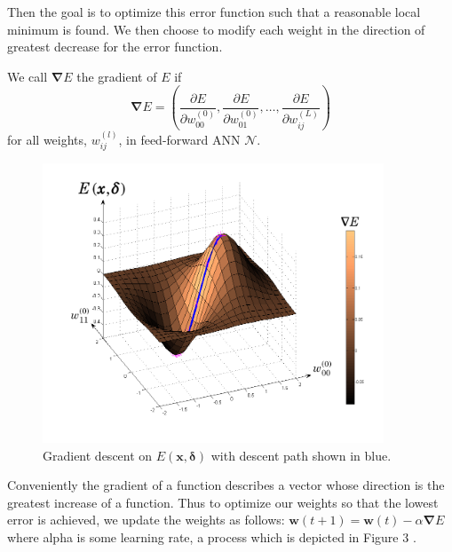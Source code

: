 Then the goal is to optimize this error function such that a reasonable local minimum is found. We then choose to modify each weight in the direction of greatest decrease for the error function. 
\begin{definition}
We call \(\pmb{\nabla}E\) the gradient of \(E\) if 
\[\pmb{\nabla}E = \left(\frac{\partial E}{\partial w_{00}^{(0)}}, 
\frac{\partial E}{\partial w_{01}^{(0)}},\dots,
\frac{\partial E}{\partial w_{ij}^{(L)}}\right)\]
for all weights, \(w_{ij}^{(l)}\), in feed-forward ANN \(\mathcal{N}\).
\end{definition}
\begin{figure}
\centering
 \includegraphics[width=4in]{gradient_descent}
 \caption{Gradient descent on \(E\left(\pmb{x}, \pmb{\delta}\right)\) with descent path shown in blue.}
\end{figure}
Conveniently the gradient of a function describes a vector whose direction is the greatest increase of a function. Thus to optimize our weights so that the lowest error is achieved, we update the weights as follows: \(\pmb{w}(t+1) = \pmb{w}(t)-\alpha \pmb{\nabla}E\) where alpha is some learning rate, a process which is depicted in Figure 3 \cite{rumelhart1988learning}.


